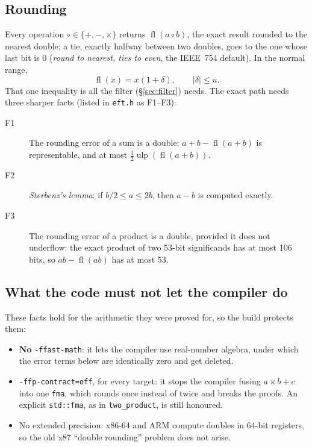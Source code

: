 \documentclass[11pt,a4paper]{article}
\newcommand{\code}[1]{\texttt{#1}}
\newcommand{\fl}{\operatorname{fl}}
\newcommand{\ulp}{\operatorname{ulp}}
\newcommand{\secref}[1]{\S\ref{#1}}
\theoremstyle{definition}
\theoremstyle{remark}
\begin{document}
\subsection{Rounding}

Every operation $\circ \in \{+,-,\times\}$ returns $\fl(a \circ b)$, the exact result rounded
to the nearest double; a tie, exactly halfway between two doubles, goes to the one whose last
bit is 0 (\emph{round to nearest, ties to even}, the IEEE~754 default). In the normal range,
\[
  \fl(x) = x(1 + \delta), \qquad |\delta| \le u .
\]
That one inequality is all the filter (\secref{sec:filter}) needs. The exact path needs three
sharper facts (listed in \code{eft.h} as F1--F3):

\begin{description}
  \item[F1] The rounding error of a sum is a double: $a + b - \fl(a+b)$ is representable,
    and at most $\tfrac12\ulp(\fl(a+b))$.
  \item[F2] \emph{Sterbenz's lemma}: if $b/2 \le a \le 2b$, then $a - b$ is computed exactly.
  \item[F3] The rounding error of a product is a double, provided it does not underflow: the
    exact product of two 53-bit significands has at most 106 bits, so $ab - \fl(ab)$ has at
    most 53.
\end{description}

\subsection{What the code must not let the compiler do}

These facts hold for the arithmetic they were proved for, so the build protects them:
\begin{itemize}
  \item \textbf{No} \code{-ffast-math}: it lets the compiler use real-number algebra, under
    which the error terms below are identically zero and get deleted.
  \item \code{-ffp-contract=off}, for every target: it stops the compiler fusing $a\times b + c$
    into one \code{fma}, which rounds once instead of twice and breaks the proofs. An explicit
    \code{std::fma}, as in \code{two\_product}, is still honoured.
  \item No extended precision: x86-64 and ARM compute doubles in 64-bit registers, so the old
    x87 ``double rounding'' problem does not arise.
\end{itemize}
\end{document}
